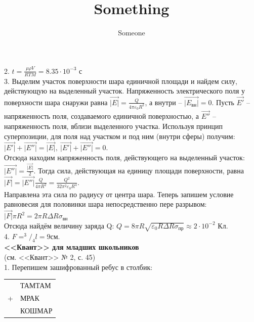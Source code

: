 \documentclass[2pt,twocolumn]{article}
\title{Something}
\author{Someone}
\newcommand\tab[1][1cm]{\hspace*{#1}}
\begin{document}
\setcounter{page}{43}
\begin{flushleft}
    \tab 2. $t = \frac{\mu\rho V}{RTM} = 8.35\cdot 10^{-3}$ с\\
    \tab 3. Выделим участок поверхности шара единичной площади и найдем силу, действующую на выделенный участок. Напряженность электрического поля у поверхности шара снаружи равна $\overset{\rightarrow}{|E|}=\frac{Q}{4\pi\varepsilon_0 R^2}$,
    а внутри -- $\overset{\rightarrow}{|E_{\text{вн}}|}=0.$ Пусть $\overset{\rightarrow}{E'}$ -- напряженность поля, создаваемого единичной поверхностью, а $\overset{\rightarrow}{E''}$ --  напряженность поля, вблизи выделенного участка. Используя
    принцип суперпозиции, для поля над участком и под ним (внутри сферы) получим:\\
    \tab$\overset{\rightarrow}{|E'|} + \overset{\rightarrow}{|E''|} =\overset{\rightarrow}{|E|},~ \overset{\rightarrow}{|E'|} + \overset{\rightarrow}{|E''|} =0.$\\
    Отсюда находим напряженность поля, действующего на выделенный участок: $\overset{\rightarrow}{|E''|}=\frac{\overset{\rightarrow}{|E|}}{2}.$ Тогда сила, действующая на единицу площади поверхности, равна\\
    \tab$\overset{\rightarrow}{|F|}=\overset{\rightarrow}{|E''|}\frac{Q}{4\pi R^2}=\frac{Q^2}{32\pi^2\varepsilon_0 R^4}.$\\
    Направлена эта сила по радиусу от центра шара. Теперь запишем условие равновесия для половинки шара непосредственно пере разрывом:\\
    \tab $\overset{\rightarrow}{|F|}\pi R^2 = 2\pi R \Delta R \sigma_{\text{вн}}$\\
    Отсюда найдём величину заряда Q:
    \tab$Q=8\pi R \sqrt{\varepsilon_0 R \Delta R \sigma_{\text{пр}}}\approx 2\cdot 10^{-2}$ Кл.\\
    \tab 4. $F = ^3/_4 l = 9$см.\\
    \textbf{<<Квант>> для младших школьников}\\
    (см. <<Квант>> № 2, с. 45)\\
    \tab 1. Перепишем зашифрованный ребус в столбик:\\
    \begin{table}[h]
        \begingroup
    \fontsize{6pt}{8pt}\selectfont
        \begin{tabular}{ll}
          & ТАМТАМ \\
        + & МРАК   \\ \hline
          & КОШМАР
        \end{tabular}%

\end{table}
\end{flushleft}
\end{document}

